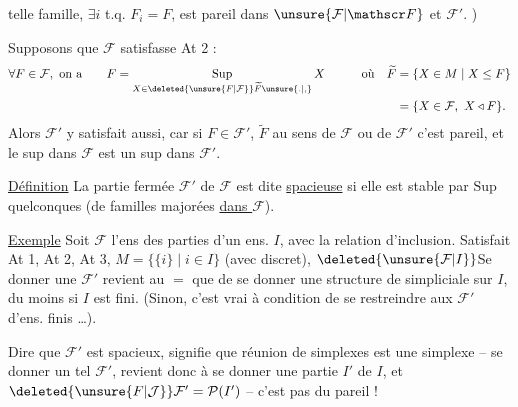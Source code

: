 telle famille, $\exists i$ t.q. $F_i=F$, est  pareil dans $\unsure{\mathcal F|\mathscr F}$ et $\mathcal F'$. )

Supposons que $\mathcal F$ satisfasse At 2 :
\[
\begin{aligned}
\forall F\in\mathcal F,\ \text{on a}\qquad
 F&=\mathop{\mathrm{Sup}}\limits_{X\in\deleted{\unsure{F|\mathcal F}}\widetilde F\unsure{.|,}}X
 &\qquad \text{où}\quad \widetilde F&=\{X\in M\mid X\leq F\}\\
 &&&=\{X\in\mathcal F,\ X\triangleleft F\}.
\end{aligned}
\]
Alors $\mathcal F'$ y satisfait aussi, car si $F\in\mathcal F'$, $\widetilde F$ au sens de $\mathcal F$ ou de $\mathcal F'$ c'est pareil, et le sup dans $\mathcal F$ est un sup dans $\mathcal F'$.

\uline{Définition} \quad La partie fermée $\mathcal F'$  de $\mathcal F$ est dite \uline{spacieuse} si elle est stable par $\mathrm{Sup}$ quelconques (de familles majorées \uline{dans $\mathcal F$}).

\uline{Exemple} \quad Soit $\mathcal F$  l'ens des parties d'un ens. $I$,  avec la relation d'inclusion. Satisfait At 1, At 2, At 3,  $M=\{\{i\}\mid i\in I\}$ (avec  discret), 
$\deleted{\unsure{\mathcal F|I}}$Se donner une $\mathcal F'$  revient au $=$ que de se donner une structure de   simpliciale sur  $I$, du moins si $I$ est fini. (Sinon, c'est vrai à condition de se restreindre aux $\mathcal F'$  d'ens. finis \ldots).

Dire que $\mathcal F'$ est spacieux, signifie que  réunion de simplexes est une simplexe -- se donner un tel $\mathcal F'$, revient donc à se donner une partie $I'$ de $I$,  et $\deleted{\unsure{F|\mathcal J}}\mathcal F'=\mathcal P(I')$ -- c'est pas du  pareil !
